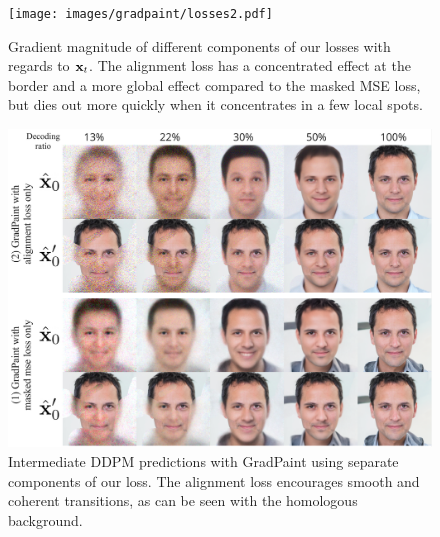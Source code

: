 \begin{figure}[htbp]
  \centering
    \texttt{[image: images/gradpaint/losses2.pdf]}
    \caption{Gradient magnitude of different components of our losses with regards to $\mathbf{x}_t$. 
    The alignment loss has a concentrated effect at the border and a more global effect
     compared to the masked MSE loss, but dies out more quickly when it concentrates in a few local spots.}
\label{fig:loss_intuition-grad}
\end{figure}

\begin{figure}[htbp]
  \centering
  \includegraphics[width=\linewidth]{images/gradpaint/losses1.pdf}
  \caption{Intermediate DDPM predictions with GradPaint using separate components of our loss. 
  The alignment loss encourages smooth and coherent transitions, as can be seen with the homologous background.}
\label{fig:loss_intuition-int}
\end{figure}








